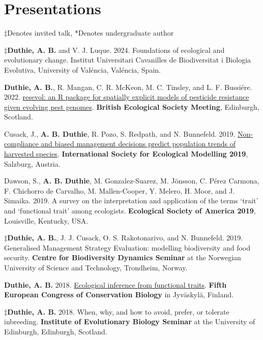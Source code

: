 \documentclass[letterpaper]{article}
\renewenvironment{itemize}{
  \begin{list}{}{
    \setlength{\leftmargin}{1.5em}
  }
}{
  \end{list}
}
\begin{document}
\section*{Presentations}
\begin{itemize}
\item $\ddagger$Denotes invited talk, *Denotes undergraduate author
\item $\ddagger${\bf Duthie, A. B.} and V. J. Luque. 2024. Foundations of ecological and evolutionary change. Institut Universitari Cavanilles de Biodiversitat i Biologia Evolutiva, University of Val\'{e}ncia, Val\'{e}ncia, Spain.
\item {\bf Duthie, A. B.}, R. Mangan, C. R. McKeon, M. C. Tinsley, and L. F. Bussi\'{e}re. 2022. \href{http://bradduthie.github.io/talks/BES2022.pdf}{resevol: an R package for spatially explicit models of pesticide resistance given evolving pest genomes}. {\bf British Ecological Society Meeting}, Edinburgh, Scotland.
\item Cusack, J., {\bf A. B. Duthie}, R. Pozo, S. Redpath, and N. Bunnefeld. 2019. \href{http://bradduthie.github.io/talks/duthie_ISEM_2019.pdf}{Non-compliance and biased management decisions predict population trends of harvested species}. {\bf International Society for Ecological Modelling 2019}, Salzburg, Austria.
\item Dawson, S., {\bf A. B. Duthie}, M. Gonzalez-Suarez, M. J\"{o}nsson, C. P\'{e}rez Carmona, F. Chichorro de Carvalho, M. Mallen-Cooper, Y. Melero, H. Moor, and J. Simaika. 2019. A survey on the interpretation and application of the terms `trait' and `functional trait' among ecologists. {\bf Ecological Society of America 2019}, Louisville, Kentucky, USA.
\item $\ddagger${\bf Duthie, A. B.}, J. J. Cusack, O. S. Rakotonarivo, and N. Bunnefeld. 2019. Generalised Management Strategy Evaluation: modelling biodiversity and food security. {\bf Centre for Biodiversity Dynamics Seminar} at the Norwegian University of Science and Technology, Trondheim, Norway.
\item {\bf Duthie, A. B.} 2018. \href{https://www.dropbox.com/s/v42iqdccpkyg55w/Duthie_ECCB2018.pdf?dl=0}{Ecological inference from functional traits}. {\bf Fifth European Congress of Conservation Biology} in Jyv\"{a}skyl\"{a}, Finland.
\item $\ddagger${\bf Duthie, A. B.} 2018. When, why, and how to avoid, prefer, or tolerate inbreeding. {\bf Institute of Evolutionary Biology Seminar} at the University of Edinburgh, Edinburgh, Scotland.

\end{itemize}
\end{document}
